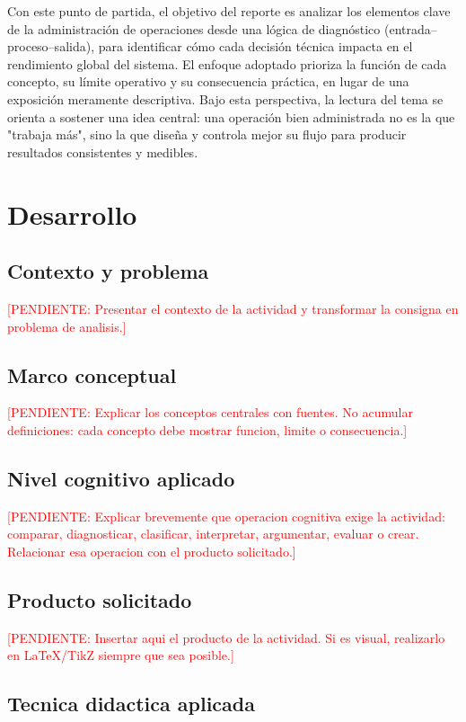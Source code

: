 \documentclass[
	spanish,
	letterpaper, oneside
]{article}
\newcommand{\pendiente}[1]{\textcolor{red}{[PENDIENTE: #1]}}
\begin{document}
Con este punto de partida, el objetivo del reporte es analizar los elementos clave de la administración de operaciones desde una lógica de diagnóstico (entrada--proceso--salida), para identificar cómo cada decisión técnica impacta en el rendimiento global del sistema. El enfoque adoptado prioriza la función de cada concepto, su límite operativo y su consecuencia práctica, en lugar de una exposición meramente descriptiva. Bajo esta perspectiva, la lectura del tema se orienta a sostener una idea central: una operación bien administrada no es la que "trabaja más", sino la que diseña y controla mejor su flujo para producir resultados consistentes y medibles.

\section{Desarrollo}

\subsection{Contexto y problema}

\pendiente{Presentar el contexto de la actividad y transformar la consigna en problema de analisis.}

\subsection{Marco conceptual}

\pendiente{Explicar los conceptos centrales con fuentes. No acumular definiciones: cada concepto debe mostrar funcion, limite o consecuencia.}

\subsection{Nivel cognitivo aplicado}

\pendiente{Explicar brevemente que operacion cognitiva exige la actividad: comparar, diagnosticar, clasificar, interpretar, argumentar, evaluar o crear. Relacionar esa operacion con el producto solicitado.}

\subsection{Producto solicitado}

\pendiente{Insertar aqui el producto de la actividad. Si es visual, realizarlo en LaTeX/TikZ siempre que sea posible.}

\subsection{Tecnica didactica aplicada}
\end{document}
